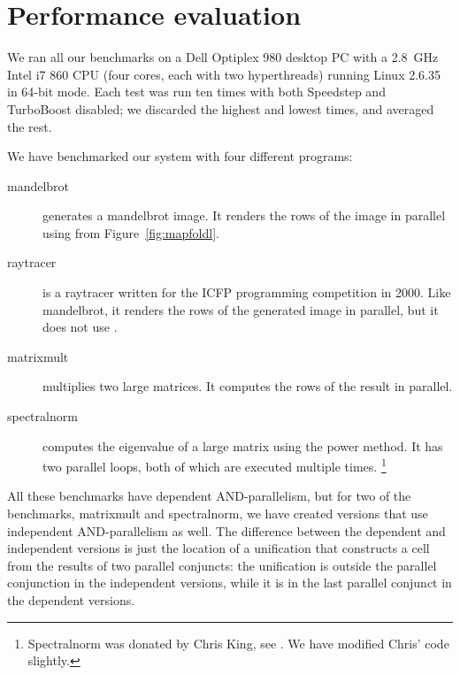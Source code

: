 
\section{Performance evaluation}
\label{sec:perf}

We ran all our benchmarks on
a Dell Optiplex 980 desktop PC with a 2.8~GHz Intel i7 860 CPU
(four cores, each with two hyperthreads)
running Linux 2.6.35 in 64-bit mode.
Each test was run ten times
with both Speedstep and TurboBoost disabled;
we discarded the highest and lowest times, and averaged the rest.

We have benchmarked our system with four different programs:
\begin{description}
\item[mandelbrot]
generates a mandelbrot image.
It renders the rows of the image in parallel
using \mapfoldl{} from Figure~\ref{fig:mapfoldl}.
\item[raytracer]
is a raytracer written for
the ICFP programming competition in 2000.
Like mandelbrot, it renders the rows of the generated image in parallel,
but it does not use \mapfoldl{}.
\item[matrixmult]
multiplies two large matrices.
It computes the rows of the result in parallel.
\item[spectralnorm]
computes the eigenvalue of a large matrix using the power method.
It has two parallel loops, both of which are executed multiple times.
\footnote{
Spectralnorm was donated by Chris King, see
.
We have modified Chris' code slightly.}
\end{description}

\noindent
All these benchmarks have dependent AND-parallelism,
but for two of the benchmarks, matrixmult and spectralnorm,
we have created versions that use independent AND-parallelism as well.
The difference between the dependent and independent versions
is just the location of a unification that constructs a cell
from the results of two parallel conjuncts:
the unification is outside the parallel conjunction in the independent versions,
while it is in the last parallel conjunct in the dependent versions.

